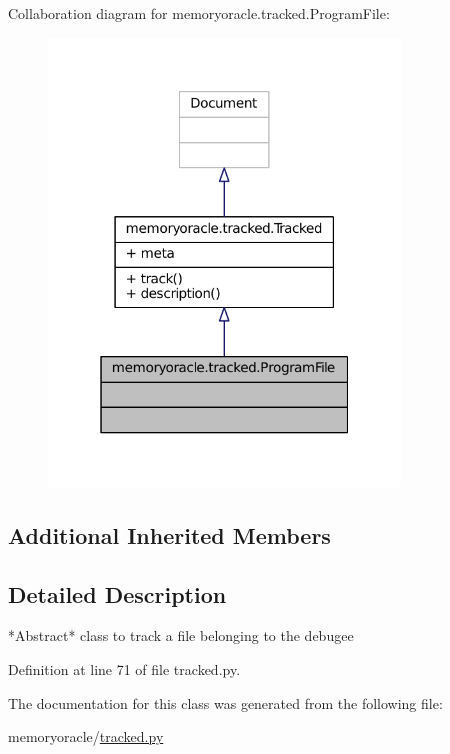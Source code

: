 Collaboration diagram for memoryoracle.\+tracked.\+Program\+File\+:
\nopagebreak
\begin{figure}[H]
\begin{center}
\leavevmode
\includegraphics[width=265pt]{classmemoryoracle_1_1tracked_1_1ProgramFile__coll__graph}
\end{center}
\end{figure}
\subsection*{Additional Inherited Members}


\subsection{Detailed Description}
\begin{DoxyVerb}*Abstract* class to track a file belonging to the debugee
\end{DoxyVerb}
 

Definition at line 71 of file tracked.\+py.



The documentation for this class was generated from the following file\+:\begin{DoxyCompactItemize}
\item 
memoryoracle/\hyperlink{tracked_8py}{tracked.\+py}\end{DoxyCompactItemize}
